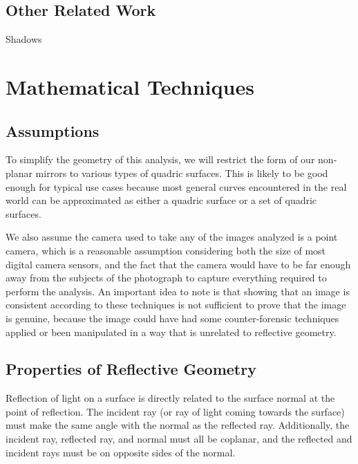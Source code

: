 \documentclass{article}
\begin{document}
\subsection{Other Related Work}
Shadows

\section{Mathematical Techniques}
\subsection{Assumptions}
To simplify the geometry of this analysis, we will restrict the form of our non-planar mirrors to various types of quadric surfaces. This is likely to be good enough for typical use cases because most general curves encountered in the real world can be approximated as either a quadric surface or a set of quadric surfaces.

We also assume the camera used to take any of the images analyzed is a point camera, which is a reasonable assumption considering both the size of most digital camera sensors, and the fact that the camera would have to be far enough away from the subjects of the photograph to capture everything required to perform the analysis.
An important idea to note is that showing that an image is consistent according to these techniques is not sufficient to prove that the image is genuine, because the image could have had some counter-forensic techniques applied or been manipulated in a way that is unrelated to reflective geometry.

\subsection{Properties of Reflective Geometry}
Reflection of light on a surface is directly related to the surface normal at the point of reflection. The incident ray (or ray of light coming towards the surface) must make the same angle with the normal as the reflected ray.  Additionally, the incident ray, reflected ray, and normal must all be coplanar, and the reflected and incident rays must be on opposite sides of the normal.
\end{document}
